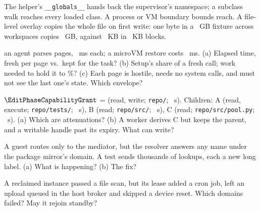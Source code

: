 \documentclass{studysheet}
\begin{document}
\begin{rightcol}
%
  {The helper's \texttt{\_\_globals\_\_} hands back the supervisor's namespace; a subclass walk
   reaches every loaded class. A process or VM boundary bounds reach.}{}
%
  {A file-level overlay copies the whole file on first write: one byte in a ~GB fixture
   across  workspaces copies ~GB, against ~KB in ~KB blocks.}{}

\vspace{2pt}
\begin{qs}
\item \assumed{} an agent parses  pages, ~ms each; a microVM restore
  costs ~ms. (a) Elapsed time, fresh per page vs.\ kept for the task? (b) Setup's share of
  a fresh call; work needed to hold it to \%? (c) Each page is hostile, needs no system calls,
  and must not see the last one's state. Which envelope?
\item \assumed{} $\EditPhaseCapabilityGrant$ = (read, write; \texttt{repo/}; ~s). Children:
  A (read, execute; \texttt{repo/tests/}; ~s), B (read; \texttt{repo/src/}; ~s),
  C (read; \texttt{repo/src/pool.py}; ~s). (a) Which are attenuations? (b) A worker derives
  C but keeps the parent, and a writable handle past its expiry. What can write?
\item A guest routes only to the mediator, but the resolver answers any name under the package
  mirror's domain. A test sends thousands of lookups, each a new long label. (a) What is happening?
  (b) The fix?
\item A reclaimed instance passed a file scan, but its lease added a cron job, left an upload queued
  in the host broker and skipped a device reset. Which domains failed? May it rejoin standby?
\end{qs}
\end{rightcol}
\end{document}
